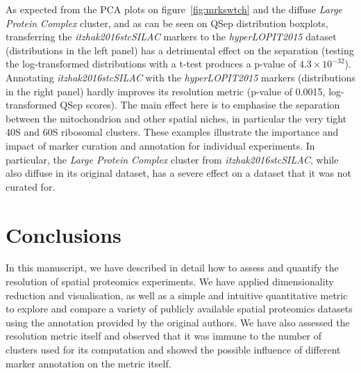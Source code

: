\documentclass[12pt]{article}\usepackage[]{graphicx}\usepackage[]{color}
\begin{document}
As expected from the PCA plots on figure~\ref{fig:mrkswtch} and the
diffuse \textit{Large Protein Complex} cluster, and as can be seen on
QSep distribution boxplots, transferring the
\textit{itzhak2016stcSILAC} markers to the \textit{hyperLOPIT2015}
dataset (distributions in the left panel) has a detrimental effect on
the separation (testing the log-transformed distributions with a
t-test produces a p-value of \ensuremath{4.3\times 10^{-32}}). Annotating
\textit{itzhak2016stcSILAC} with the \textit{hyperLOPIT2015} markers
(distributions in the right panel) hardly improves its resolution
metric (p-value of 0.0015, log-transformed QSep
scores). The main effect here is to emphasise the separation between
the mitochondrion and other spatial niches, in particular the very
tight 40S and 60S ribosomal clusters. These examples illustrate the
importance and impact of marker curation and annotation for individual
experiments. In particular, the \textit{Large Protein Complex} cluster
from \textit{itzhak2016stcSILAC}, while also diffuse in its original
dataset, has a severe effect on a dataset that it was not curated for.

\section{Conclusions}

In this manuscript, we have described in detail how to assess and
quantify the resolution of spatial proteomics experiments. We have
applied dimensionality reduction and visualisation, as well as a
simple and intuitive quantitative metric to explore and compare a
variety of publicly available spatial proteomics datasets using the
annotation provided by the original authors. We have also assessed the
resolution metric itself and observed that it was immune to the number
of clusters used for its computation and showed the possible influence
of different marker annotation on the metric itself.

\bigskip
\end{document}
